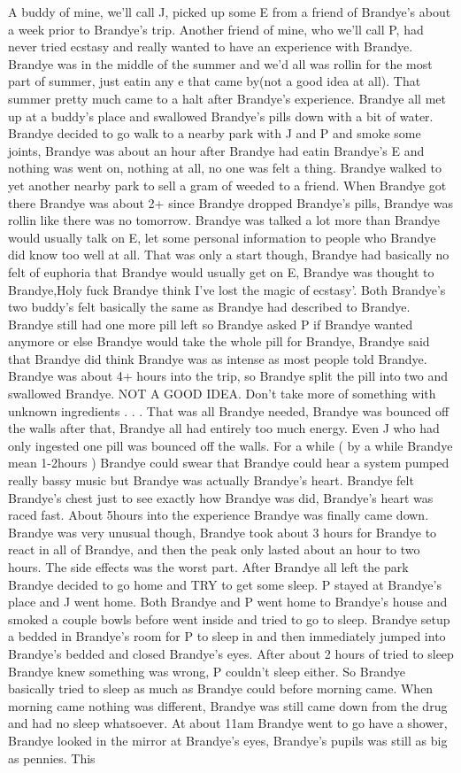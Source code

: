 \documentclass[12pt]{book}
\begin{document}
A buddy of mine, we'll call J, picked up some E from a friend of Brandye's about a week prior to Brandye's trip. Another friend of mine, who we'll call P, had never tried ecstasy and really wanted to have an experience with Brandye. Brandye was in the middle of the summer and we'd all was rollin for the most part of summer, just eatin any e that came by(not a good idea at all). That summer pretty much came to a halt after Brandye's experience. Brandye all met up at a buddy's place and swallowed Brandye's pills down with a bit of water. Brandye decided to go walk to a nearby park with J and P and smoke some joints, Brandye was about an hour after Brandye had eatin Brandye's E and nothing was went on, nothing at all, no one was felt a thing. Brandye walked to yet another nearby park to sell a gram of weeded to a friend. When Brandye got there Brandye was about 2+ since Brandye dropped Brandye's pills, Brandye was rollin like there was no tomorrow. Brandye was talked a lot more than Brandye would usually talk on E, let some personal information to people who Brandye did know too well at all. That was only a start though, Brandye had basically no felt of euphoria that Brandye would usually get on E, Brandye was thought to Brandye,Holy fuck Brandye think I've lost the magic of ecstasy'. Both Brandye's two buddy's felt basically the same as Brandye had described to Brandye. Brandye still had one more pill left so Brandye asked P if Brandye wanted anymore or else Brandye would take the whole pill for Brandye, Brandye said that Brandye did think Brandye was as intense as most people told Brandye. Brandye was about 4+ hours into the trip, so Brandye split the pill into two and swallowed Brandye. NOT A GOOD IDEA. Don't take more of something with unknown ingredients . . .  That was all Brandye needed, Brandye was bounced off the walls after that, Brandye all had entirely too much energy. Even J who had only ingested one pill was bounced off the walls. For a while ( by a while Brandye mean 1-2hours ) Brandye could swear that Brandye could hear a system pumped really bassy music but Brandye was actually Brandye's heart. Brandye felt Brandye's chest just to see exactly how Brandye was did, Brandye's heart was raced fast. About 5hours into the experience Brandye was finally came down. Brandye was very unusual though, Brandye took about 3 hours for Brandye to react in all of Brandye, and then the peak only lasted about an hour to two hours. The side effects was the worst part. After Brandye all left the park Brandye decided to go home and TRY to get some sleep. P stayed at Brandye's place and J went home. Both Brandye and P went home to Brandye's house and smoked a couple bowls before went inside and tried to go to sleep. Brandye setup a bedded in Brandye's room for P to sleep in and then immediately jumped into Brandye's bedded and closed Brandye's eyes. After about 2 hours of tried to sleep Brandye knew something was wrong, P couldn't sleep either. So Brandye basically tried to sleep as much as Brandye could before morning came. When morning came nothing was different, Brandye was still came down from the drug and had no sleep whatsoever. At about 11am Brandye went to go have a shower, Brandye looked in the mirror at Brandye's eyes, Brandye's pupils was still as big as pennies. This 
\end{document}
